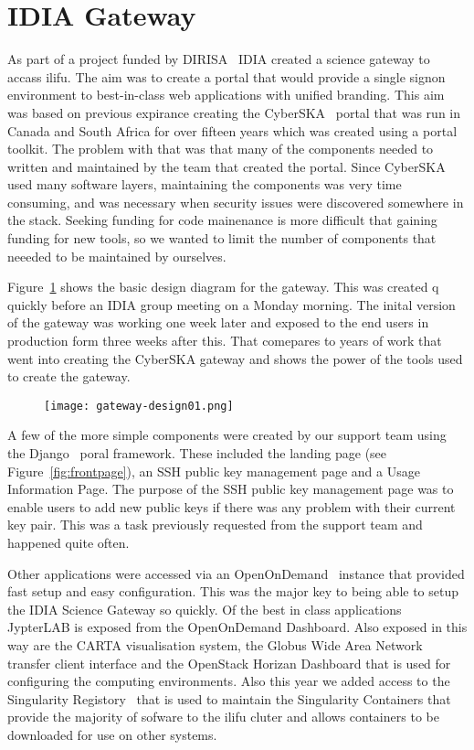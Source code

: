 \documentclass[12pt,twocolumn,a4paper]{article}
\begin{document}
\section{IDIA Gateway}
\label{sec:gateway}

As part of a project funded by DIRISA~\cite{DIRISA2015} IDIA created a science gateway to accass ilifu. The aim was to create
a portal that would provide a single signon environment to best-in-class web applications with unified branding. 
This aim was based on 
previous expirance creating the CyberSKA~\cite{cyberska} portal that was run in Canada and South Africa for over fifteen 
years which
was created using a portal toolkit. The problem with that was that many of the components needed to written and maintained
by the team that created the portal. Since CyberSKA used many software 
layers, maintaining the components was very time consuming, and was necessary when security issues were discovered
somewhere in the stack.
Seeking funding for code mainenance is more difficult that gaining funding 
for new tools, so we wanted to limit the number of
components that neeeded to be maintained by ourselves.

Figure~\ref{fig:gateway_design} shows the basic design diagram for the gateway. This was created q
quickly before an IDIA group meeting on a Monday morning. The inital version of the gateway was working one week later and
exposed to the end users in production form three weeks after this. That comepares to years of work that went
 into creating the CyberSKA gateway
and shows the power of the tools used to create the gateway.

\begin{figure}
    \texttt{[image: gateway-design01.png]}
    \caption{}
    \label{fig:gateway_design}
\end{figure}

A few of the more simple components were created by our support team using the Django~\cite{Django} 
poral framework.
These included the landing page (see Figure~\ref{fig:frontpage}), an SSH public 
key management page and a Usage Information
Page. The purpose of the SSH public key management page was to enable users to add new public keys if
there was any problem with their current key pair. This was a task previously requested from the
support team and happened quite often.

Other applications were accessed via an OpenOnDemand~\cite{openondemand} instance that provided fast
setup and easy configuration. This was the major key to being able to setup the IDIA Science 
Gateway so quickly.
Of the best in class applications JypterLAB is exposed from the OpenOnDemand Dashboard. Also exposed in this
way are the CARTA visualisation system, the Globus Wide Area Network transfer client interface and the OpenStack Horizan
Dashboard that is used for configuring the computing environments. Also this year we added access
to the Singularity Registory~\cite{singularityregistory} that is used to maintain the Singularity 
Containers that provide the majority of sofware to the ilifu cluter and allows containers to be downloaded
for use on other systems.
\end{document}
